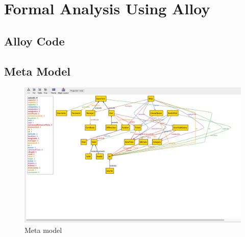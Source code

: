 \section{Formal Analysis Using Alloy}




\def\alloy{\lstinline[
	language=alloy,
	style=alloy,
	basicstyle=\ttfamily\small
]}

\renewcommand{\ttdefault}{pcr}  %
\lstset{
	basicstyle=\ttfamily\large
}

\subsection{Alloy Code}

\clearpage

\subsection{Meta Model}

\begin{figure}[H]
	\centering
	\includegraphics[width=0.9\textheight,keepaspectratio, angle=90]{images/alloy_metamodel.png}
	\caption{Meta model}
\end{figure}
\clearpage

